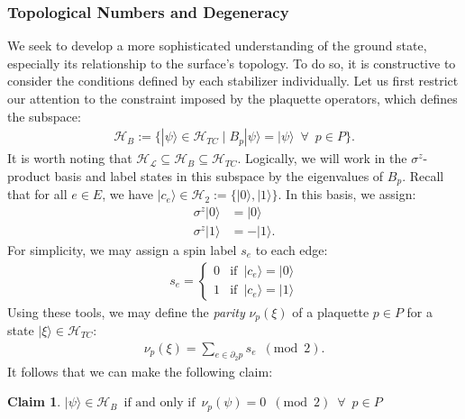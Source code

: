 \documentclass[12pt]{article}
\newtheorem{claim}[theorem]{Claim}
\theoremstyle{definition}
\begin{document}
\subsubsection{Topological Numbers and Degeneracy}
We seek to develop a more sophisticated understanding of the ground state, especially its relationship to the surface's topology. To do so, it is constructive to consider the conditions defined by each stabilizer individually. Let us first restrict our attention to the constraint imposed by the plaquette operators, which defines the subspace:
    \begin{align}
        \mathcal{H}_B := \{|\psi\rangle\in\mathcal{H}_{TC}\mid B_p|\psi\rangle = |\psi\rangle\enspace\forall\enspace p\in P\}.
    \end{align} 
It is worth noting that $\mathcal{H_L}\subseteq\mathcal{H}_B\subseteq\mathcal{H}_{TC}$. Logically, we will work in the $\sigma^z$-product basis and label states in this subspace by the eigenvalues of $B_p$. Recall that for all $e\in E$, we have $|c_e\rangle\in\mathcal{H}_2 := \{|0\rangle,|1\rangle\}$. In this basis, we assign:
    \begin{align}
        \sigma^z|0\rangle &= |0\rangle\\
        \sigma^z|1\rangle &= -|1\rangle.
    \end{align}
For simplicity, we may assign a spin label $s_e$ to each edge:
    \begin{align}
        s_e = \begin{cases}
            0 & \mbox{if}\enspace |c_e\rangle = |0\rangle\\
            1 & \mbox{if}\enspace |c_e\rangle = |1\rangle
        \end{cases}
    \end{align}
Using these tools, we may define the \emph{parity} $\nu_p(\xi)$ of a plaquette $p\in P$ for a state $|\xi\rangle\in\mathcal{H}_{TC}$:
    \begin{align}
        \nu_p(\xi) = \sum_{e\in\partial_2p}s_e\enspace(\text{mod}\enspace2).
    \end{align}
It follows that we can make the following claim:
    \begin{claim}
        $|\psi\rangle\in\mathcal{H}_B\enspace\text{if and only if}\enspace \nu_p(\psi) = 0\enspace(\text{mod}\enspace2)\enspace\forall\enspace p\in P$
    \end{claim}
\end{document}
